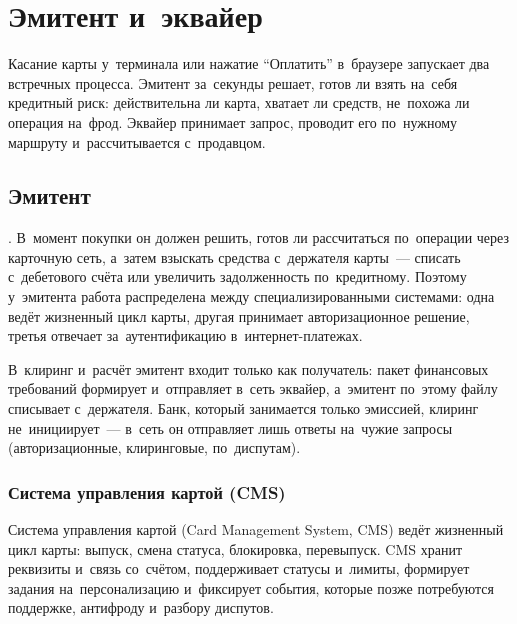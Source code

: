 
\chapter{Эмитент и~эквайер}\label{ch:issuer-acquirer}

Касание карты у~терминала или нажатие \enquote{Оплатить} в~браузере запускает
два встречных процесса. Эмитент за~секунды решает, готов ли взять на~себя
кредитный риск: действительна ли карта, хватает ли средств, не~похожа ли
операция на~фрод. Эквайер принимает запрос, проводит его по~нужному
маршруту и~рассчитывается с~продавцом.

\section{Эмитент}\label{sec:ia-issuer}

. В~момент покупки он должен решить, готов ли рассчитаться
по~операции через карточную сеть, а~затем взыскать средства с~держателя
карты~--- списать с~дебетового счёта или увеличить задолженность по~кредитному.
Поэтому у~эмитента работа распределена между специализированными системами:
одна ведёт жизненный цикл карты, другая принимает авторизационное решение,
третья отвечает за~аутентификацию
в~интернет-платежах.

В~клиринг и~расчёт эмитент входит только как получатель: пакет финансовых
требований формирует и~отправляет в~сеть эквайер, а~эмитент по~этому файлу
списывает с~держателя. Банк, который занимается только эмиссией, клиринг
не~инициирует~--- в~сеть он отправляет лишь ответы на~чужие запросы
(авторизационные, клиринговые, по~диспутам).

\subsection*{Система управления картой (CMS)}

Система управления картой (Card Management System, CMS) ведёт жизненный цикл
карты: выпуск, смена статуса, блокировка, перевыпуск. CMS хранит реквизиты
и~связь со~счётом, поддерживает статусы и~лимиты, формирует задания
на~персонализацию и~фиксирует события, которые позже потребуются поддержке,
антифроду и~разбору диспутов.

